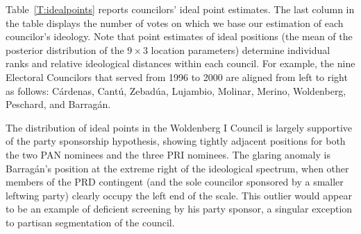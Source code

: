 \documentclass[12 pt, letter]{article}
\begin{document}
Table~\ref{T:idealpoints} reports councilors' ideal point estimates.
The last column in the table displays the number of votes on which
we base our estimation of each councilor's ideology. Note that point
estimates of ideal positions (the mean of the posterior distribution
of the $9 \times 3$ location parameters) determine individual ranks
and relative ideological distances within each council.  For
example, the nine Electoral Councilors that served from 1996 to 2000
are aligned from left to right as follows: C\'ardenas, Cant\'u,
Zebad\'ua, Lujambio, Molinar, Merino, Woldenberg, Peschard, and
Barrag\'an.

The distribution of ideal points in the Woldenberg I Council is
largely supportive of the party sponsorship hypothesis, showing
tightly adjacent positions for both the two PAN nominees and the
three PRI nominees.  The glaring anomaly is Barrag\'an's position at
the extreme right of the ideological spectrum, when other members of
the PRD contingent (and the sole councilor sponsored by a smaller
leftwing party) clearly occupy the left end of the scale.  This
outlier would appear to be an example of deficient screening by his
party sponsor, a singular exception to partisan segmentation of the
council.
\end{document}
